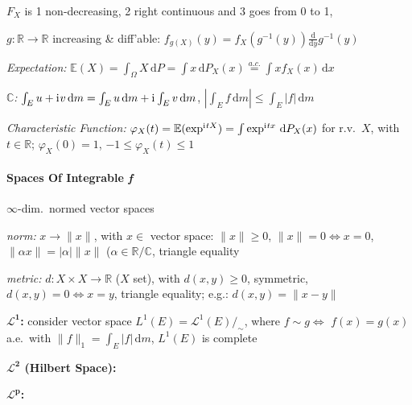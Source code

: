\documentclass[8pt,twoside]{extarticle}
\newcommand{\compi}{\mathrm{i}\mkern1mu}
\begin{document}
\begin{multicols}{2}
$F_X$ is 1 non-decreasing, 2 right continuous and 3 goes from 0 to 1,



$g:\mathbb{R}\to\mathbb{R}$ increasing  \& diff'able: $f_{g(X)}(y){=}f_X(g^{-1}(y))\frac{\mathrm{d}}{\mathrm{d}y}g^{-1}(y)$

\textit{Expectation:} $\mathbb{E}(X)=\int_{\Omega}X\,\mathrm{d}P
=\int x\,\mathrm{d}P_X(x)
\overset{a.c.}{=}\int xf_X(x)\,\mathrm{d}x$

\textit{$\mathbb{C}$:} $\int_E u+\compi v \,\mathrm{d}m = \int_E u \,\mathrm{d}m  + \compi \int_E v \,\mathrm{d}m $, $|\int_E f \,\mathrm{d}m| \leq \int_E |f| \,\mathrm{d}m$

\textit{Characteristic Function:} $\varphi_X(t)=\mathbb{E}(\exp^{\compi tX}) = \int \exp^{\compi tx} \, \mathrm{d}P_X(x)$ for r.v.\ $X$, with $t\in \mathbb{R}$;
$\varphi_X(0)=1$, $-1\leq\varphi_X(t)\leq 1$


\paragraph{Spaces Of Integrable \textit{f}} $\infty$-dim.\ normed vector spaces 

\textit{norm:} $x\to \|x\|$, with $x\in$ vector space: $\| x\|\geq 0$, $\| x\|=0 \Leftrightarrow x=0$, $\|\alpha x\| =|\alpha| \| x\|$ ($\alpha\in\mathbb{R}/\mathbb{C}$, triangle equality

\textit{metric:}  $d:X\times X \to \mathbb{R}$ ($X$ set), with $d(x,y)\geq 0$, symmetric, $d(x,y){=}0 \Leftrightarrow x{=}y$, triangle equality; e.g.: $d(x,y)=\|x{-}y\|$

\textbf{$\boldsymbol{\mathcal{L}^1}$:} consider vector space $L^1(E) = \mathcal{L}^1(E)/_\sim$, where $f\sim g \Leftrightarrow $ $ f(x)=g(x)$ a.e.\ with $\|f\|_1=\int_E|f|\,\mathrm{d}m$, $L^1(E)$ is complete

\textbf{$\boldsymbol{\mathcal{L}^2}$ (Hilbert Space):}

\textbf{$\boldsymbol{\mathcal{L}^p}$:}


\end{multicols}


\end{document}

